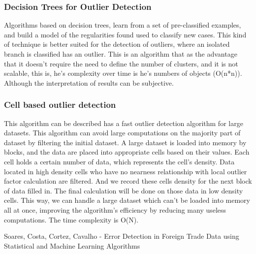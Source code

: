 \documentclass{llncs}
\begin{document}
\subsubsection{Decision Trees for Outlier Detection}
Algorithms based on decision trees, learn from a set of pre-classified examples, and build a model of the regularities found used to classify new cases.
This kind of technique is better suited for the detection of outliers, where an isolated branch is classified has an outlier.
This is an algorithm that as the advantage that it doesn't require the need to define the number of clusters, and it is not scalable, this is, he's complexity over time is he's numbers of objects (O(n*n)). Although the interpretation of results can be subjective.

\subsubsection{Cell based outlier detection}
This algorithm can be described has a fast outlier detection algorithm for large datasets. This algorithm can avoid large computations on the majority part of dataset by filtering the initial dataset.
A large dataset is loaded into memory by blocks, and the data are placed into appropriate cells based on their values. Each cell holds a certain number of data, which represents the cell's density. Data located in high density cells who have no nearness relationship with local outlier factor calculation are filtered. And we record these cells density for the next block of data filled in. The final calculation will be done on those data in low density cells. This way, we can handle a large dataset which can't be loaded into memory all at once, improving the algorithm's efficiency by reducing many useless computations. The time complexity is O(N).

\begin{thebibliography}{9}
Soares, Costa, Cortez, Cavalho - Error Detection in Foreign Trade Data   using Statistical and Machine Learning Algorithms
\end{thebibliography}
\end{document}
